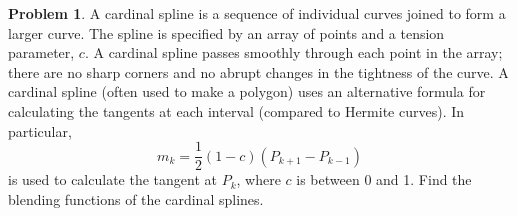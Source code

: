 \documentclass[10pt]{article}
\theoremstyle{plain}
\theoremstyle{definition}
\newtheorem{prob}{Problem}
\numberwithin{equation}{section}
\begin{document}
\hrulefill
\begin{prob}
    A cardinal spline is a sequence of individual curves joined to form a
    larger curve. The spline is specified by an array of points and a tension
    parameter, $c$. A cardinal spline passes smoothly through each point in the
    array; there are no sharp corners and no abrupt changes in the tightness
    of the curve. A cardinal spline (often used to make a polygon) uses an
    alternative formula for calculating the tangents at each interval
    (compared to Hermite curves). In particular, 
    \[
            m_k = \frac{1}{2}(1-c)\left(P_{k+1} - P_{k-1}\right)
        \]
    is used to calculate the tangent at $P_k$, where $c$ is between 0 and 1.
    Find the blending functions of the cardinal splines.
\end{prob}
\end{document}
